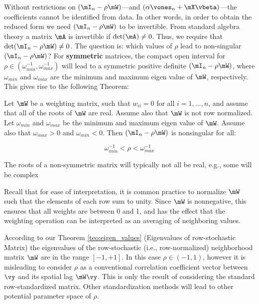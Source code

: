\documentclass[english,12pt]{book}\usepackage[]{graphicx}\usepackage[]{xcolor}
\begin{document}
Without restrictions on $(\mI_n-\rho\mW)$---and $\left(\alpha \vones_n + \mX\vbeta\right)$---the coefficients cannot be identified from data. In other words, in order to obtain the reduced form we need $(\mI_n-\rho\mW)$ to be invertible. From standard algebra theory a matrix $\mA$ is invertible if $\det(\mA)\neq 0$. Thus, we require that $\det(\mI_n -\rho\mW)\neq 0$. The question is: which values of $\rho$ lead to non-singular $(\mI_n -\rho\mW)$? For \textbf{symmetric} matrices, the compact open interval for $\rho \in \left( \omega_{min}^{-1}, \omega_{max}^{-1}\right)$ will lead to a symmetric positive definite $(\mI_n -\rho\mW)$, where $\omega_{min}$ and $\omega_{max}$ are the minimum and maximum eigen value of $\mW$, respectively. This gives rise to the following Theorem:

\begin{theorem}[Invertibility]
Let $\mW$ be a weighting matrix, such that $w_{ii} = 0$ for all $i = 1,...,n$, and assume that all of the roots of $\mW$ are real. Assume also that $\mW$ is not row normalized. Let $\omega_{min}$ and $\omega_{max}$ be the minimum and maximum eigen value of $\mW$. Assume also that $\omega_{max} > 0$ and $\omega_{min} < 0$. Then $\left(\mI_n - \rho\mW\right)$ is nonsingular for all:

\begin{equation*}
  \omega_{min}^{-1} < \rho < \omega_{max}^{-1}
\end{equation*}
\end{theorem}

\begin{remark}
The roots of a non-symmetric matrix will typically not all be real, e.g., some will be complex
\end{remark}

Recall that for ease of interpretation, it is common practice to normalize $\mW$ such that the elements of each row sum to unity. Since $\mW$ is nonnegative, this ensures that all weights are between 0 and 1, and has the effect that the weighting operation can be interpreted as an averaging of neighboring values. 

According to our Theorem \ref{teo:eigen_values} (Eigenvalues of row-stochastic Matrix) the eigenvalues of the row-stochastic (i.e., row-normalized) neighborhood matrix $\mW$ are in the range $\left[-1, +1\right]$. In this case $\rho \in (-1, 1)$, however it is misleading to consider $\rho$ as a conventional correlation coefficient vector between $\vy$ and its spatial lag $\mW\vy$. This is only the result of considering the standard row-standardized matrix. Other standardization methods will lead to other potential parameter space of $\rho$. 
\end{document}
